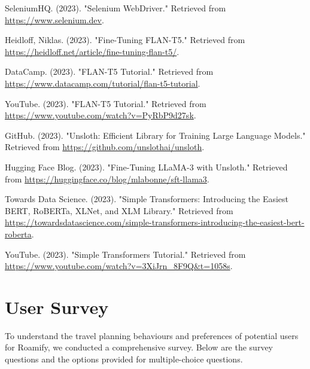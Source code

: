 \documentclass[final,1p,times]{elsarticle}
\begin{document}
\begin{thebibliography}{99}
        SeleniumHQ. (2023). "Selenium WebDriver." Retrieved from \url{https://www.selenium.dev}.

        Heidloff, Niklas. (2023). "Fine-Tuning FLAN-T5." Retrieved from \url{https://heidloff.net/article/fine-tuning-flan-t5/}.

        DataCamp. (2023). "FLAN-T5 Tutorial." Retrieved from \url{https://www.datacamp.com/tutorial/flan-t5-tutorial}.

        YouTube. (2023). "FLAN-T5 Tutorial." Retrieved from \url{https://www.youtube.com/watch?v=PyRbP9d27sk}.
    
        GitHub. (2023). "Unsloth: Efficient Library for Training Large Language Models." Retrieved from \url{https://github.com/unslothai/unsloth}.
    
        Hugging Face Blog. (2023). "Fine-Tuning LLaMA-3 with Unsloth." Retrieved from \url{https://huggingface.co/blog/mlabonne/sft-llama3}.
    
        Towards Data Science. (2023). "Simple Transformers: Introducing the Easiest BERT, RoBERTa, XLNet, and XLM Library." Retrieved from \url{https://towardsdatascience.com/simple-transformers-introducing-the-easiest-bert-roberta}.
    
        YouTube. (2023). "Simple Transformers Tutorial." Retrieved from \url{https://www.youtube.com/watch?v=3XiJrn_8F9Q&t=1058s}.


\end{thebibliography}

\newpage

\appendix

\section{User Survey}
    To understand the travel planning behaviours and preferences of potential users for Roamify, we conducted a comprehensive survey. Below are the survey questions and the options provided for multiple-choice questions.
\end{document}
